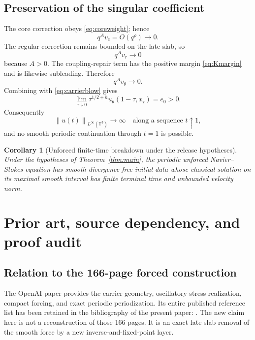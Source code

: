 \documentclass[11pt]{article}
\newtheorem{corollary}[theorem]{Corollary}
\numberwithin{equation}{section}
\newcommand{\T}{\mathbb T^3}
\newcommand{\norm}[1]{\left\lVert #1\right\rVert}
\begin{document}
\subsection{Preservation of the singular coefficient}
The core correction obeys \eqref{eq:coreweight}; hence
\begin{equation}
q^A v_c=O(q^\rho)\longrightarrow0.
\label{eq:coresub}
\end{equation}
The regular correction remains bounded on the late slab, so
\begin{equation}
q^A v_r\longrightarrow0
\label{eq:regsub}
\end{equation}
because \(A>0\).  The coupling-repair term has the positive margin \eqref{eq:Kmargin} and is likewise subleading.  Therefore
\begin{equation}
q^Av_\theta\longrightarrow0.
\label{eq:allsub}
\end{equation}
Combining with \eqref{eq:carrierblow} gives
\begin{equation}
\boxed{
\lim_{\tau\downarrow0}\tau^{1/2+h}u_\theta(1-\tau,x_\tau)=e_0>0.}
\label{eq:finalblow}
\end{equation}
Consequently
\begin{equation}
\norm{u(t)}_{L^\infty(\T)}\to\infty
\quad\text{along a sequence }t\uparrow1,
\label{eq:Linftyblow}
\end{equation}
and no smooth periodic continuation through \(t=1\) is possible.

\begin{corollary}[Unforced finite-time breakdown under the release hypotheses]
Under the hypotheses of Theorem~\ref{thm:main}, the periodic unforced Navier--Stokes equation has smooth divergence-free initial data whose classical solution on its maximal smooth interval has finite terminal time and unbounded velocity norm.
\end{corollary}

\section{Prior art, source dependency, and proof audit}\label{sec:audit}

\subsection{Relation to the 166-page forced construction}
The OpenAI paper \cite{OpenAI2026NS} provides the carrier geometry, oscillatory stress realization, compact forcing, and exact periodic periodization.  Its entire published reference list has been retained in the bibliography of the present paper: \cite{AlbrittonBrueColombo2022,BillantGallaire2005,BillantGallaire2013,BuckmasterVicol2019,CKN1982,CordobaMartinezZoroa2023,CordobaMartinezZoroa2024,CordobaMartinezZoroaZheng2026,CraikCriminale1986,DaneriSzekelyhidi2017,EscauriazaSereginSverak2003,Euler1757,FeffermanClay,FriedlanderVishik1991,LeibovichStewartson1983,Leray1934,LifschitzHameiri1991,Navier1827,SinghSridhar2017,Stein1970,Stokes1845,Tao2016}.  The new claim here is not a reconstruction of those 166 pages.  It is an exact late-slab removal of the smooth force by a new inverse-and-fixed-point layer.
\end{document}
